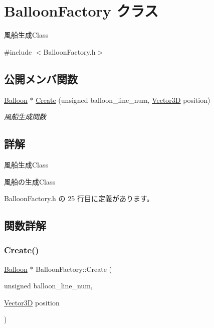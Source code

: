 \hypertarget{class_balloon_factory}{}\section{Balloon\+Factory クラス}
\label{class_balloon_factory}


風船生成\+Class  




{\ttfamily \#include $<$Balloon\+Factory.\+h$>$}

\subsection*{公開メンバ関数}
\begin{DoxyCompactItemize}
\item 
\mbox{\hyperlink{class_balloon}{Balloon}} $\ast$ \mbox{\hyperlink{class_balloon_factory_a74729096919f75a423d477d050386bba}{Create}} (unsigned balloon\+\_\+line\+\_\+num, \mbox{\hyperlink{class_vector3_d}{Vector3D}} position)
\begin{DoxyCompactList}\small\item\em 風船生成関数 \end{DoxyCompactList}\end{DoxyCompactItemize}


\subsection{詳解}
風船生成\+Class 

風船の生成\+Class 

 Balloon\+Factory.\+h の 25 行目に定義があります。



\subsection{関数詳解}
\mbox{\label{class_balloon_factory_a74729096919f75a423d477d050386bba}} 
\subsubsection{\texorpdfstring{Create()}{Create()}}
{\footnotesize\ttfamily \mbox{\hyperlink{class_balloon}{Balloon}} $\ast$ Balloon\+Factory\+::\+Create (\begin{DoxyParamCaption}\item[{unsigned}]{balloon\+\_\+line\+\_\+num,  }\item[{\mbox{\hyperlink{class_vector3_d}{Vector3D}}}]{position }\end{DoxyParamCaption})}



